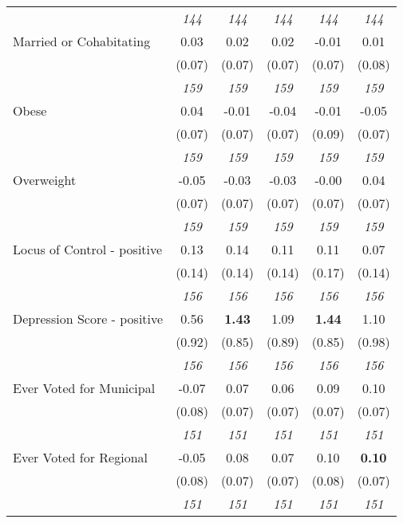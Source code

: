 \begin{tabular}{l c c c c c}
& \textit{ 144 } & \textit{ 144 } & \textit{ 144 } & \textit{ 144 } & \textit{ 144 } \\
Married or Cohabitating & 0.03 & 0.02 & 0.02 & -0.01 & 0.01 \\
& (0.07) & (0.07) & (0.07) & (0.07) & (0.08) \\
& \textit{ 159 } & \textit{ 159 } & \textit{ 159 } & \textit{ 159 } & \textit{ 159 } \\
Obese & 0.04 & -0.01 & -0.04 & -0.01 & -0.05 \\
& (0.07) & (0.07) & (0.07) & (0.09) & (0.07) \\
& \textit{ 159 } & \textit{ 159 } & \textit{ 159 } & \textit{ 159 } & \textit{ 159 } \\
Overweight & -0.05 & -0.03 & -0.03 & -0.00 & 0.04 \\
& (0.07) & (0.07) & (0.07) & (0.07) & (0.07) \\
& \textit{ 159 } & \textit{ 159 } & \textit{ 159 } & \textit{ 159 } & \textit{ 159 } \\
Locus of Control - positive & 0.13 & 0.14 & 0.11 & 0.11 & 0.07 \\
& (0.14) & (0.14) & (0.14) & (0.17) & (0.14) \\
& \textit{ 156 } & \textit{ 156 } & \textit{ 156 } & \textit{ 156 } & \textit{ 156 } \\
Depression Score - positive & 0.56 & \textbf{ 1.43 } & 1.09 & \textbf{1.44} & 1.10 \\
& (0.92) & (0.85) & (0.89) & (0.85) & (0.98) \\
& \textit{ 156 } & \textit{ 156 } & \textit{ 156 } & \textit{ 156 } & \textit{ 156 } \\
Ever Voted for Municipal & -0.07 & 0.07 & 0.06 & 0.09 & 0.10 \\
& (0.08) & (0.07) & (0.07) & (0.07) & (0.07) \\
& \textit{ 151 } & \textit{ 151 } & \textit{ 151 } & \textit{ 151 } & \textit{ 151 } \\
Ever Voted for Regional & -0.05 & 0.08 & 0.07 & 0.10 & \textbf{0.10} \\
& (0.08) & (0.07) & (0.07) & (0.08) & (0.07) \\
& \textit{ 151 } & \textit{ 151 } & \textit{ 151 } & \textit{ 151 } & \textit{ 151 } \\
\bottomrule
\end{tabular}

